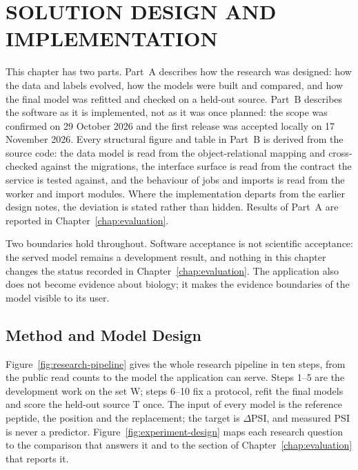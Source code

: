 \chapter{SOLUTION DESIGN AND IMPLEMENTATION}\label{chap:design}

This chapter has two parts. Part~A describes how the research was designed: how the data and labels
evolved, how the models were built and compared, and how the final model was refitted and checked on
a held-out source. Part~B describes the software as it is implemented, not as it was once planned:
the scope was confirmed on 29 October 2026 and the first release was accepted locally on
17 November 2026. Every structural figure and table in Part~B is derived from the source code: the
data model is read from the object-relational mapping and cross-checked against the migrations, the
interface surface is read from the contract the service is tested against, and the behaviour of jobs
and imports is read from the worker and import modules. Where the implementation departs from the
earlier design notes, the deviation is stated rather than hidden. Results of Part~A are reported in
Chapter~\ref{chap:evaluation}.

Two boundaries hold throughout. Software acceptance is not scientific acceptance: the served model
remains a development result, and nothing in this chapter changes the status recorded in
Chapter~\ref{chap:evaluation}. The application also does not become evidence about biology; it makes
the evidence boundaries of the model visible to its user.




\section{Method and Model Design}\label{sec:method-design}
Figure~\ref{fig:research-pipeline} gives the whole research pipeline in ten steps, from the public
read counts to the model the application can serve. Steps 1--5 are the development work on the set W;
steps 6--10 fix a protocol, refit the final models and score the held-out source T once. The input of
every model is the reference peptide, the position and the replacement; the target is $\Delta$PSI, and
measured PSI is never a predictor. Figure~\ref{fig:experiment-design} maps each research question to
the comparison that answers it and to the section of Chapter~\ref{chap:evaluation} that reports it.

